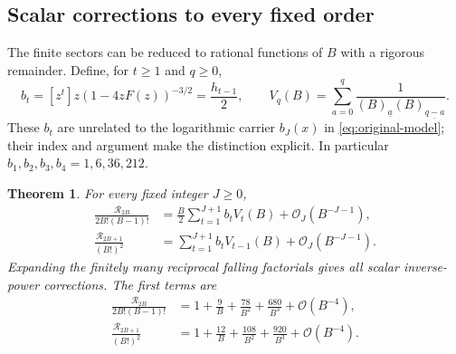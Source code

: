 \documentclass[11pt,letterpaper]{article}
\numberwithin{equation}{section}
\newtheorem{theorem}{Theorem}[section]
\theoremstyle{remark}\newtheorem{remark}[theorem]{Remark}
\newcommand{\Ord}{\mathcal O}
\newcommand{\fall}[2]{(#1)_{\underline{#2}}}
\begin{document}
\subsection{Scalar corrections to every fixed order}
The finite sectors can be reduced to rational functions of $B$ with a rigorous remainder. Define, for $t\ge1$ and $q\ge0$,
\begin{equation}\label{eq:scalar-def}
 b_t=[z^t]z(1-4zF(z))^{-3/2}=\frac{h_{t-1}}2,
 \qquad
 V_q(B)=\sum_{a=0}^{q}\frac1{\fall B a\fall B{q-a}}.
\end{equation}
These $b_t$ are unrelated to the logarithmic carrier $b_J(x)$ in \eqref{eq:original-model}; their index and argument make the distinction explicit. In particular $b_1,b_2,b_3,b_4=1,6,36,212$.

\begin{theorem}\label{thm:scalar}
For every fixed integer $J\ge0$,
\begin{align}
 \frac{\mathcal R_{2B}}{2B!(B-1)!}
 &=\frac B2\sum_{t=1}^{J+1}b_tV_t(B)
                                  +\Ord_J(B^{-J-1}),\label{eq:scalar-even}\\
 \frac{\mathcal R_{2B+1}}{(B!)^2}
 &=\sum_{t=1}^{J+1}b_tV_{t-1}(B)
                                  +\Ord_J(B^{-J-1}).\label{eq:scalar-odd}
\end{align}
Expanding the finitely many reciprocal falling factorials gives all scalar inverse-power corrections. The first terms are
\begin{align}
 \frac{\mathcal R_{2B}}{2B!(B-1)!}
 &=1+\frac9B+\frac{78}{B^2}+\frac{680}{B^3}+\Ord(B^{-4}),\label{eq:scalar-first-even}\\
 \frac{\mathcal R_{2B+1}}{(B!)^2}
 &=1+\frac{12}B+\frac{108}{B^2}+\frac{920}{B^3}+\Ord(B^{-4}).\label{eq:scalar-first-odd}
\end{align}
\end{theorem}
\end{document}

